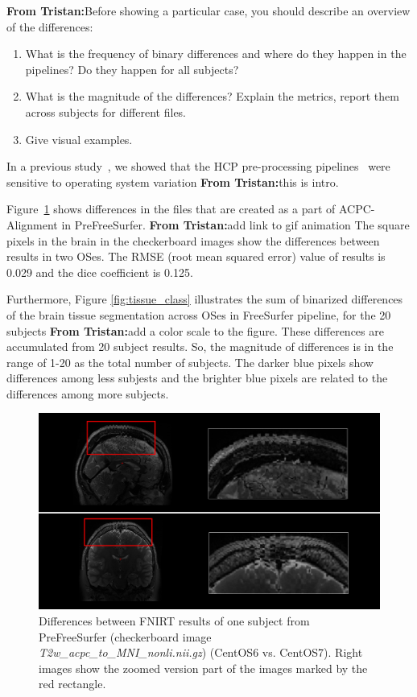 \documentclass[a4paper,num-refs]{oup-contemporary}
\newcommand{\tristan}[1]{\color{blue}\textbf{From Tristan:}#1\color{black}}
\begin{document}
\tristan{Before showing a particular case, you should describe 
an overview of the differences:
\begin{enumerate}
  \item What is the frequency of binary differences and where do they happen in the pipelines? Do they happen for all subjects?
  \item What is the magnitude of the differences? Explain the metrics, report them across subjects for different files.
  \item Give visual examples.
\end{enumerate}

In a previous study~\cite{Scaria2017}, we showed that the HCP pre-processing 
pipelines~\cite{glasser2013} were 
sensitive to operating system variation \tristan{this is intro}. 

Figure~\ref{fig:fnirt_result} shows differences in the files 
that are created as a part of ACPC-Alignment in PreFreeSurfer. \tristan{add link to gif animation}
The square pixels in the brain in the checkerboard images show the differences between results in two OSes. 
The RMSE (root mean squared error) value of results is 0.029 and the dice coefficient is 0.125.

Furthermore, Figure 
\ref{fig:tissue_class} illustrates the sum of binarized differences 
of the brain tissue segmentation across OSes in FreeSurfer pipeline, for the 20 subjects \tristan{add a color 
scale to the figure}.
These differences are accumulated from 20 subject results.
So, the magnitude of differences is in the range of 1-20 as the total number of subjects.
The darker blue pixels show differences among less subjests and 
the brighter blue pixels are related to the differences among more subjects.



\begin{figure}
  \centering
    \includegraphics[width=\columnwidth]{images/segmentation.png} 
    \caption{Differences between FNIRT results of one subject from PreFreeSurfer 
    (checkerboard image \emph{T2w\_acpc\_to\_MNI\_nonli.nii.gz}) (CentOS6 vs. 
    CentOS7). Right images show the zoomed version part of the images marked 
    by the red rectangle.} 
    \label{fig:fnirt_result}
\end{figure}

}
\end{document}
